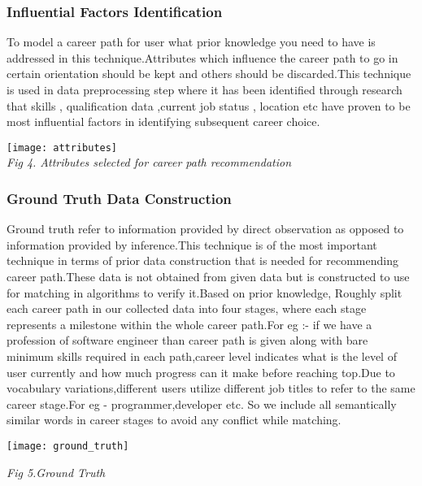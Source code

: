 \documentclass[journal]{IEEEtran}
\begin{document}
   \subsubsection{\textbf{Influential Factors Identification}}
        To model a career path for user what prior knowledge you need to have is addressed in this technique.Attributes which influence the career path to go in certain orientation should be kept and others should be discarded.This technique is used in data preprocessing step where it has been identified through research that skills , qualification data ,current job status , location etc have proven to be most influential factors in identifying subsequent career choice.
        \begin{center}
        \texttt{[image: attributes]}
        \\\caption{\textit{Fig 4. Attributes selected for career path recommendation}}
        \end{center}
        
        
    \subsubsection{\textbf{Ground Truth Data Construction}}
        Ground truth refer to information provided by direct observation as opposed to information provided by inference.This technique is of the most important technique in terms of prior data construction that is needed for recommending career path.These data is not obtained from given data but is constructed to use for matching in algorithms to verify it.Based on prior knowledge, Roughly split each career path in our collected data into four stages, where each stage represents a milestone within the whole career path.For eg :- if we have a profession of software engineer than career path is given along with bare minimum skills required in each path,career level indicates what is the level of user currently and how much progress can it make before reaching top.Due to vocabulary variations,different users utilize different job titles to
        refer to the same career stage.For eg - programmer,developer etc.
        So we include all semantically similar words in career stages to avoid any conflict while matching. 
        
        \begin{center}
        \texttt{[image: ground\_truth]}
        \caption{\textit{Fig 5.Ground Truth}}
        \end{center}
   
\end{document}
